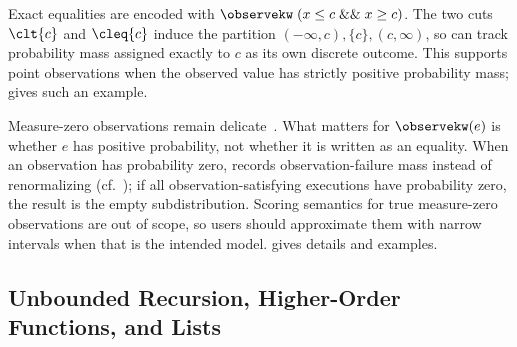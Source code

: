 Exact equalities are encoded with $\observekw\; (x \leq c \mathrel{\&\&} x \geq c)$. The two cuts $\clt{c}$ and $\cleq{c}$ induce the partition $(-\infty,c), \{c\}, (c,\infty)$, so \Slice{} can track probability mass assigned exactly to $c$ as its own discrete outcome. This supports point observations when the observed value has strictly positive probability mass;  gives such an example.

Measure-zero observations remain delicate~\cite{Jacobs2021ParadoxesProbProg}. What matters for $\observekw(e)$ is whether $e$ has positive probability, not whether it is written as an equality. When an observation has probability zero, \Slice{} records observation-failure mass instead of renormalizing (cf.\ ); if all observation-satisfying executions have probability zero, the result is the empty subdistribution. Scoring semantics for true measure-zero observations are out of scope, so users should approximate them with narrow intervals when that is the intended model.  gives details and examples.



\subsection{Unbounded Recursion, Higher-Order Functions, and Lists}\label{sec:examples:7}
\newcommand{\linelabel}[1]{%
  \edef\@currentlabel{\thelstnumber}%
  \label{#1}%
}

